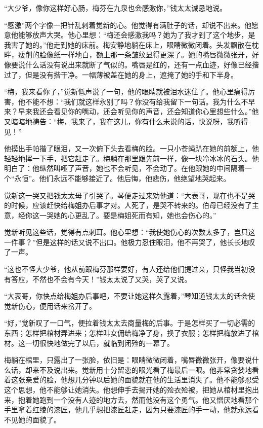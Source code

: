 \par “大少爷，像你这样好心肠，梅芬在九泉也会感激你，”钱太太诚恳地说。
\par “感激”两个字像一把针乱刺着觉新的心。他觉得有满肚子的话，却说不出来。他愿意他能够放声大哭。他心里想：“梅还会感激我吗？她为了我才到了这个地步，是我害了她的。”他走到她的床前。梅安静地躺在床上，眼睛微微闭着。头发飘散在枕畔，瘦削的脸像纸一样地白，额上那一条皱纹显得更深了。她的嘴唇微微张开，好像要说什么话没有说出来就断了气似的。嘴唇是红的，还有一点血迹，好像已经揩过了，但是没有揩干净。一幅薄被盖在她的身上，遮掩了她的手和下半身。
\par “梅，我来看你了，”觉新低声说了一句，他的眼睛就被泪水迷住了。他心里痛得厉害，他不能不想：“我们就这样永别了吗？你没有给我留下一句话。我为什么不早来？早来我还会看见你的嘴动，还会听见你的声音，还会知道你心里想些什么。”他又暗暗地祷告：“梅，我来了，我在这儿，你有什么未说的话，快说呀，我听得见！”
\par 他摸出手帕揩了眼泪，又一次俯下头去看梅的脸。一只小苍蝇趴在她的前额上，他轻轻地挥一下手，把它赶走了。梅躺在那里跟先前一样，像一块冷冰冰的石头。他明白了：他纵然叫哑了声音，她也不会听见，不会动了。在他跟她的中间隔着一个“永恒”。他们永远不能够接近了。他后悔，他悲伤，他绝望地哭起来。
\par 觉新这一哭又把钱太太母子引哭了。琴便走过来劝他道：“大表哥，现在也不是哭的时候，应该赶快给梅姐办后事才对。人死了，是哭不转来的。伯母已经没有了主意，经你这一哭她的心更乱了。要是梅姐死而有知，她也会伤心的。”
\par 觉新听见这些话，觉得有点刺耳。他心里想：“我使她伤心的次数太多了，岂只这一件事？”但是这样的话又说不出口。他极力忍住眼泪，他不再哭了，他长长地叹了一声。
\par “这也不怪大少爷，他从前跟梅芬那样要好，有人还给他们提过亲，只怪我当初没有答应，不然也不会有今天！”钱太太说了又哭，哭了又说。
\par “大表哥，你快点给梅姐办后事吧，不要让她这样久露着，”琴知道钱太太的话会使觉新伤心，便用话来岔开了。
\par “好，”觉新叹了一口气，便拉着钱太太去商量梅的后事。于是怎样买了一切必需的东西；怎样把棺材弄进来；怎样叫女佣给梅净了身，换了衣服；怎样把梅放进了棺材。这一切很快地做完了以后，就临到闭殓的一幕了。
\par 梅躺在棺里，只露出了一张脸，依旧是：眼睛微微闭着，嘴唇微微张开，像要说什么话，却来不及说出来。觉新用十分留恋的眼光看了梅最后一眼。他非常贪婪地看着这张亲爱的脸，他想几分钟以后她的面貌就在他的生活里消失了。他不能够忍受这个思想，他不能够让她消失。他想伸手去揭开她的殓衣殓被，把她从棺材里抱出来，抱着她跑到一个没有人迹的地方去，然而他没有这个勇气。他又憎厌地看那个手里拿着红绫的漆匠，他几乎想把漆匠赶走，因为只要漆匠的手一动，他就永远看不见她的面貌了。
